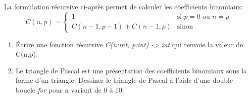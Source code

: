 \documentclass[a4paper,11pt]{article}
\begin{document}
\begin{Form}
\begin{exo}
La formulation récursive ci-après permet de calculer les coefficients binomiaux:
$$
C(n,p) = \left\{
    \begin{array}{ll}
        1 & \mbox{si } p=0 \mbox{ ou } n=p\\
        C(n-1,p-1)+C(n-1,p) & \mbox{sinon}\
    \end{array}
\right.
$$
\begin{enumerate}
\item Écrire une fonction récursive \emph{C(n:int, p:int) -> int} qui renvoie la valeur de C(n,p).
\item Le triangle de Pascal est une présentation des coefficients binomiaux sous la forme d'un triangle. Dessiner le triangle de Pascal à l'aide d'une double boucle \emph{for} pour n variant de 0 à 10.
\end{enumerate}
\end{exo}
\end{Form}
\end{document}
